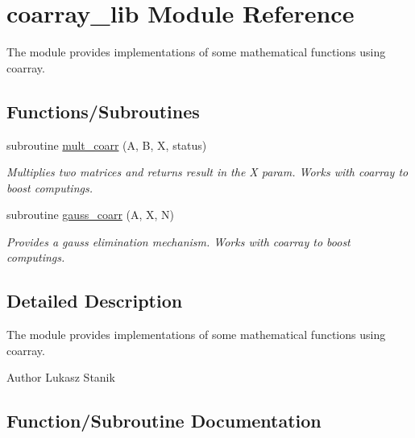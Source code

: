 \hypertarget{namespacecoarray__lib}{}\section{coarray\+\_\+lib Module Reference}
\label{namespacecoarray__lib}


The module provides implementations of some mathematical functions using coarray.  


\subsection*{Functions/\+Subroutines}
\begin{DoxyCompactItemize}
\item 
subroutine \mbox{\hyperlink{namespacecoarray__lib_a834d78e243124fb4b218d9e17e71c033}{mult\+\_\+coarr}} (A, B, X, status)
\begin{DoxyCompactList}\small\item\em Multiplies two matrices and returns result in the {\ttfamily X} param. Works with coarray to boost computings. \end{DoxyCompactList}\item 
subroutine \mbox{\hyperlink{namespacecoarray__lib_a1dbf310aeabc215161c4368152ea4e37}{gauss\+\_\+coarr}} (A, X, N)
\begin{DoxyCompactList}\small\item\em Provides a gauss elimination mechanism. Works with coarray to boost computings. \end{DoxyCompactList}\end{DoxyCompactItemize}


\subsection{Detailed Description}
The module provides implementations of some mathematical functions using coarray. 

\begin{DoxyAuthor}{Author}
Lukasz Stanik 
\end{DoxyAuthor}


\subsection{Function/\+Subroutine Documentation}
\mbox{\label{namespacecoarray__lib_a1dbf310aeabc215161c4368152ea4e37}} 
